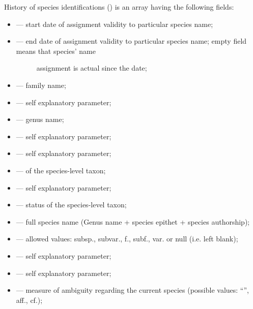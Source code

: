 \documentclass[letterpaper,10pt,english]{sphinxmanual}
\begin{document}
History of species identifications () is an array having the following fields:
\begin{itemize}
\item {} 
 — start date of assignment validity to particular species name;

\item {} \begin{description}
\item[{ — end date of assignment validity to particular species name; empty field means that species’ name}] \leavevmode
assignment is actual since the  date;

\end{description}

\item {} 
 — family name;

\item {} 
 — self explanatory parameter;

\item {} 
 — genus name;

\item {} 
 — self explanatory parameter;

\item {} 
 — self explanatory parameter;

\item {} 
 —  of the species-level taxon;

\item {} 
 — self explanatory parameter;

\item {} 
 —  status of the species-level taxon;

\item {} 
 — full species name (Genus name + species epithet + species authorship);

\item {} 
 — allowed values:  subsp., subvar., f., subf., var. or null (i.e. left blank);

\item {} 
 — self explanatory parameter;

\item {} 
 — self explanatory parameter;

\item {} 
 — measure of ambiguity regarding the current species (possible values: “”, aff., cf.);

\end{itemize}
\end{document}
